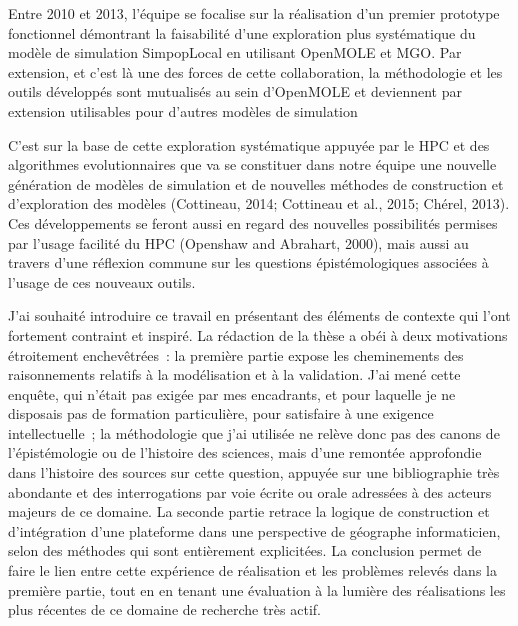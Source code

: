 Entre 2010 et 2013, l'équipe se focalise sur la réalisation d'un premier prototype fonctionnel démontrant la faisabilité d'une exploration plus systématique du modèle de simulation SimpopLocal en utilisant OpenMOLE et MGO. Par extension, et c'est là une des forces de cette collaboration, la méthodologie et les outils développés sont mutualisés au sein d'OpenMOLE et deviennent par extension utilisables pour d'autres modèles de simulation \autocite{Schmitt2014, Reuillon2015} 
 
C'est sur la base de cette exploration systématique appuyée par le HPC et des algorithmes evolutionnaires que va se constituer dans notre équipe une nouvelle génération de modèles de simulation et de nouvelles méthodes de construction et d'exploration des modèles (Cottineau, 2014; Cottineau et al., 2015; Chérel, 2013)⁠.  Ces développements se feront aussi en regard des nouvelles possibilités permises par l'usage facilité du HPC (Openshaw and Abrahart, 2000)⁠, mais aussi au travers d'une réflexion commune sur les questions épistémologiques associées à l'usage de ces nouveaux outils. 

J’ai souhaité introduire ce travail en présentant des éléments de contexte qui l’ont fortement contraint et inspiré. La rédaction de la thèse a obéi à deux motivations étroitement enchevêtrées : la première partie expose les cheminements des raisonnements relatifs à la modélisation et à la validation. J’ai mené cette enquête, qui n’était pas exigée par mes encadrants, et pour laquelle je ne disposais pas de formation particulière, pour satisfaire à une exigence intellectuelle ; la méthodologie que j’ai utilisée ne relève donc pas des canons de l’épistémologie ou de l’histoire des sciences, mais d’une remontée approfondie dans l’histoire des sources sur cette question, appuyée sur une bibliographie très abondante et des interrogations par voie écrite ou orale adressées à des acteurs majeurs de ce domaine. La seconde partie retrace la logique de construction et d’intégration d’une plateforme dans une perspective de géographe informaticien, selon des méthodes qui sont entièrement explicitées. La conclusion permet de faire le lien entre cette expérience de réalisation et les problèmes relevés dans la première partie, tout en en tenant une évaluation à la lumière des réalisations les plus récentes de ce domaine de recherche très actif. 
